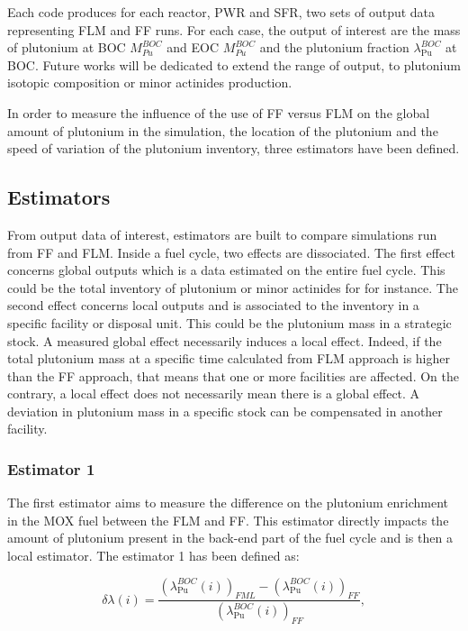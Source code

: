 Each code produces for each reactor, \gls{PWR} and \gls{SFR}, two sets of output
data representing \gls{FLM} and \gls{FF} runs. For each case, the output of
interest are the mass of plutonium at \gls{BOC} $M_{Pu}^{BOC}$ and \gls{EOC}
$M_{Pu}^{BOC}$ and the plutonium fraction $\lambda_{\mathrm{Pu}}^{BOC}$ at
\gls{BOC}. Future works will be dedicated to extend the range of output, to
plutonium isotopic composition or minor actinides production. 

In order to measure the influence of the use of \gls{FF} versus \gls{FLM} on the
global amount of plutonium in the simulation, the location of the plutonium and
the speed of variation of the plutonium inventory, three estimators have been
defined.


\subsection{Estimators\label{subsec:estimator}}

From output data of interest, estimators are built to compare simulations run
from \gls{FF} and \gls{FLM}. Inside a fuel cycle, two effects are dissociated.
The first effect concerns global outputs which is a data estimated on the entire
fuel cycle. This could be the total inventory of plutonium or minor actinides
for for instance. The second effect concerns local outputs and is associated to
the inventory in a specific facility or disposal unit. This could be the
plutonium mass in a strategic stock. A measured global effect necessarily
induces a local effect. Indeed, if the total plutonium mass at a specific time
calculated from \gls{FLM} approach is higher than the \gls{FF} approach, that
means that one or more facilities are affected. On the contrary, a local effect
does not necessarily mean there is a global effect. A deviation in plutonium
mass in a specific stock can be compensated in another facility.


\subsubsection{Estimator 1}

The first estimator aims to measure the difference on the plutonium enrichment
in the \gls{MOX} fuel between the \gls{FLM} and \gls{FF}. This estimator directly
impacts the amount of plutonium present in the back-end part of the fuel cycle
and is then a local estimator. The estimator 1 has been defined as:

\begin{equation}
    \delta{\lambda}(i) =
        \frac{\left(\lambda_{\mathrm{Pu}}^{BOC}(i)\right)_{FML}
              - \left(\lambda_{\mathrm{Pu}}^{BOC}(i)\right)_{FF}}
              {\left(\lambda_{\mathrm{Pu}}^{BOC}(i)\right)_{FF}},
\end{equation}


